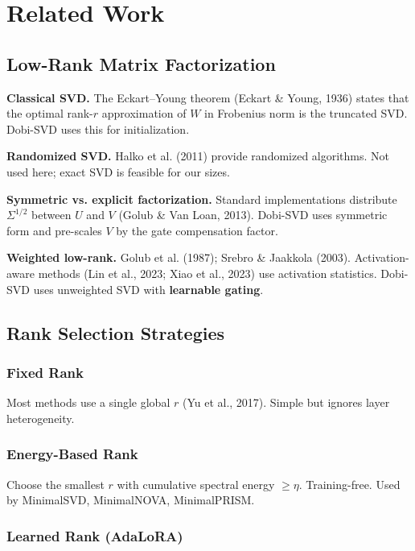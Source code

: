 
\section{Related Work}

\subsection{Low-Rank Matrix Factorization}

\textbf{Classical SVD.} The Eckart--Young theorem (Eckart \& Young, 1936) states 
that the optimal rank-$r$ approximation of $W$ in Frobenius norm is the 
truncated SVD. Dobi-SVD uses this for initialization.

\textbf{Randomized SVD.} Halko et al. (2011) provide randomized algorithms. Not 
used here; exact SVD is feasible for our sizes.

\textbf{Symmetric vs. explicit factorization.} Standard implementations distribute 
$\Sigma^{1/2}$ between $U$ and $V$ (Golub \& Van Loan, 2013). Dobi-SVD 
uses symmetric form and pre-scales $V$ by the gate compensation factor.

\textbf{Weighted low-rank.} Golub et al. (1987); Srebro \& Jaakkola (2003). 
Activation-aware methods (Lin et al., 2023; Xiao et al., 2023) use 
activation statistics. Dobi-SVD uses unweighted SVD with \textbf{learnable gating}.

\subsection{Rank Selection Strategies}

\subsubsection{Fixed Rank}

Most methods use a single global $r$ (Yu et al., 2017). Simple but ignores 
layer heterogeneity.

\subsubsection{Energy-Based Rank}

Choose the smallest $r$ with cumulative spectral energy $\geq \eta$. 
Training-free. Used by MinimalSVD, MinimalNOVA, MinimalPRISM.

\subsubsection{Learned Rank (AdaLoRA)}

